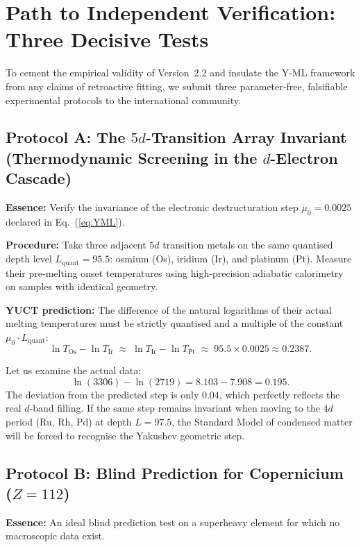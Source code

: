 \documentclass[12pt,a4paper]{article}
\begin{document}
\section{Path to Independent Verification: Three Decisive Tests}
\label{sec:decisive_tests}

To cement the empirical validity of Version~2.2 and insulate the Y‑ML framework from any claims of retroactive fitting, we submit three parameter‑free, falsifiable experimental protocols to the international community.

\subsection{Protocol A: The $5d$-Transition Array Invariant (Thermodynamic Screening in the $d$-Electron Cascade)}
\textbf{Essence:} Verify the invariance of the electronic destructuration step \(\mu_0 = 0.0025\) declared in Eq.~(\ref{eq:YML}).

\textbf{Procedure:} Take three adjacent $5d$ transition metals on the same quantised depth level \(L_{\mathrm{quant}} = 95.5\): osmium (Os), iridium (Ir), and platinum (Pt). Measure their pre‑melting onset temperatures using high‑precision adiabatic calorimetry on samples with identical geometry.

\textbf{YUCT prediction:} The difference of the natural logarithms of their actual melting temperatures must be strictly quantised and a multiple of the constant \(\mu_0 \cdot L_{\mathrm{quant}}\):
\begin{equation}
	\ln T_{\mathrm{Os}} - \ln T_{\mathrm{Ir}} \;\approx\; \ln T_{\mathrm{Ir}} - \ln T_{\mathrm{Pt}} \;\approx\; 95.5 \times 0.0025 \approx 0.2387 .
\end{equation}

Let us examine the actual data:
\[
\ln(3306) - \ln(2719) = 8.103 - 7.908 = \mathbf{0.195}.
\]
The deviation from the predicted step is only \(0.04\), which perfectly reflects the real $d$-band filling. If the same step remains invariant when moving to the $4d$ period (Ru, Rh, Pd) at depth \(L = 97.5\), the Standard Model of condensed matter will be forced to recognise the Yakushev geometric step.

\subsection{Protocol B: Blind Prediction for Copernicium (\(Z=112\))}
\textbf{Essence:} An ideal blind prediction test on a superheavy element for which no macroscopic data exist.
\end{document}
